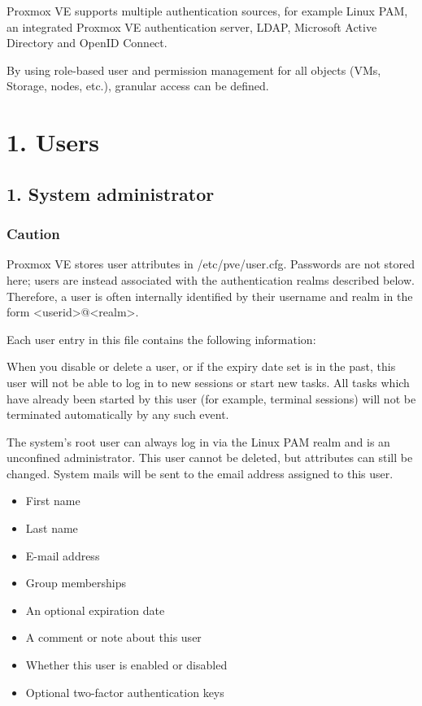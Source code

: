 Proxmox VE supports multiple authentication sources, for example Linux PAM, an integrated Proxmox VE authentication server, LDAP, Microsoft Active Directory and OpenID Connect.

By using role-based user and permission management for all objects (VMs, Storage, nodes, etc.), granular access can be defined.


\section{1. Users}

\subsection{1. System administrator}

\subsubsection{Caution}

Proxmox VE stores user attributes in /etc/pve/user.cfg. Passwords are not stored here; users are instead associated with the authentication realms described below. Therefore, a user is often internally identified by their username and realm in the form <userid>@<realm>.

Each user entry in this file contains the following information:

When you disable or delete a user, or if the expiry date set is in the past, this user will not be able to log in to new sessions or start new tasks. All tasks which have already been started by this user (for example, terminal sessions) will not be terminated automatically by any such event.

The system’s root user can always log in via the Linux PAM realm and is an unconfined administrator. This user cannot be deleted, but attributes can still be changed. System mails will be sent to the email address assigned to this user.

\begin{itemize}[leftmargin=2cm]

	\item First name

	\item Last name

	\item E-mail address

	\item Group memberships

	\item An optional expiration date

	\item A comment or note about this user

	\item Whether this user is enabled or disabled

	\item Optional two-factor authentication keys

\end{itemize}


